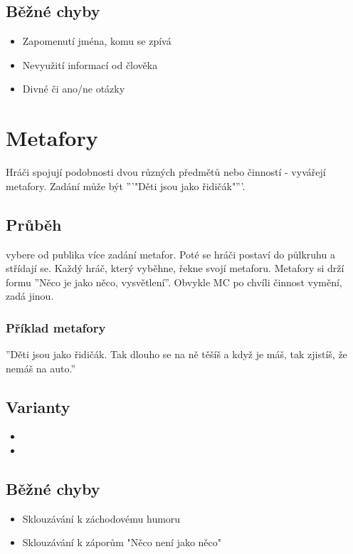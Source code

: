 \documentclass[main.tex]{subfiles}
\begin{document}
\subsection{ Běžné chyby } \begin{itemize}
\item Zapomenutí jména, komu se zpívá
\item Nevyužití informací od člověka
\item Divné či ano/ne otázky
\end{itemize}
 
 
 
 
 
 
 
\needspace{5cm} \section{Metafory} \label{metafory}  
 
Hráči spojují podobnosti dvou různých předmětů nebo činností - vyvářejí metafory. Zadání může být '''"Děti jsou jako řidičák"'''. 
 
\subsection{Průběh}  
 vybere od publika více zadání metafor. Poté se hráči postaví do půlkruhu a střídají se. Každý hráč, který vyběhne, řekne svojí metaforu. Metafory si drží formu ''{Něco} je jako {něco}, {vysvětlení}''. Obvykle MC po chvíli činnost vymění, zadá jinou. 
 
\subsubsection{Příklad metafory}  
''Děti jsou jako řidičák. Tak dlouho se na ně těšíš a když je máš, tak zjistíš, že nemáš na auto.'' 
 
\subsection{ Varianty } \begin{itemize}
\item  {}
\item  {}
\end{itemize}
 
\subsection{ Běžné chyby } \begin{itemize}
\item  Sklouzávání k záchodovému humoru
\item  Sklouzávání k záporům "Něco není jako něco"
\end{itemize}
 
\end{document}
